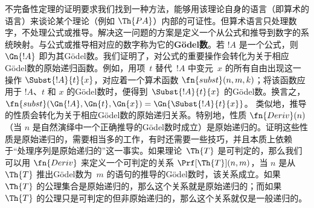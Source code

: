 不完备性定理的证明要求我们找到一种方法，能够用该理论自身的语言（即算术的语言）来谈论某个理论（例如 $\Th{PA}$）内部的可证性。但算术语言只处理数字，不处理公式或推导。解决这一问题的方案是定义一个从公式和推导到数字的系统映射。与公式或推导相对应的数字称为它的\textbf{Gödel数}。若 $!A$ 是一个公式，则 $\Gn{!A}$ 即为其Gödel数。我们证明了，对公式的重要操作会转化为关于相应Gödel数的原始递归函数。例如，用项~$t$ 替代~$!A$ 中变元~$x$ 的所有自由出现这一操作 $\Subst{!A}{t}{x}$，对应着一个算术函数 $\fn{subst}(n,m,k)$；将该函数应用于 $!A$、$t$ 和 $x$ 的Gödel数时，便得到~$\Subst{!A}{t}{x}$ 的Gödel数。换言之，$\fn{subst}(\Gn{!A}, \Gn{t}, \Gn{x}) = \Gn{\Subst{!A}{t}{x}}$。
类似地，推导的性质会转化为关于相应Gödel数的原始递归关系。特别地，性质 $\fn{Deriv}(n)$（当 $n$ 是自然演绎中一个正确推导的Gödel数时成立）是原始递归的。证明这些性质是原始递归的，需要相当多的工作，有时还需要一些技巧，并且本质上依赖于“处理序列是原始递归的”这一事实。如果理论~$\Th{T}$ 是可判定的，那么我们可以用 $\fn{Deriv}$ 来定义一个可判定的关系 $\Prf[\Th{T}](n, m)$，当 $n$ 是从~$\Th{T}$ 推出Gödel数为~$m$ 的语句的推导的Gödel数时，该关系成立。如果~$\Th{T}$ 的公理集合是原始递归的，那么这个关系就是原始递归的；而如果~$\Th{T}$ 的公理只是可判定的但非原始递归的，那么这个关系就仅是一般递归的。